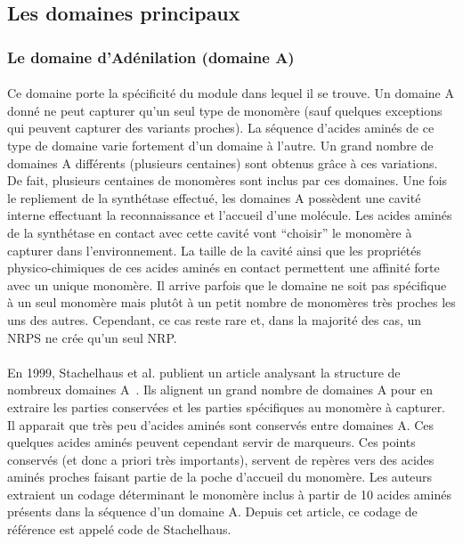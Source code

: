 \documentclass[12pt,french,twoside]{report}
\begin{document}
\subsection{Les domaines principaux}

\subsubsection{Le domaine d'Adénilation (domaine A)}

\paragraph{}Ce domaine porte la spécificité du module dans lequel il se trouve.
Un domaine A donné ne peut capturer qu'un seul type de monomère (sauf quelques exceptions qui peuvent capturer des variants proches).
La séquence d'acides aminés de ce type de domaine varie fortement d'un domaine à l'autre.
Un grand nombre de domaines A différents (plusieurs centaines) sont obtenus grâce à ces variations.
De fait, plusieurs centaines de monomères sont inclus par ces domaines.
Une fois le repliement de la synthétase effectué, les domaines A possèdent une cavité interne effectuant la reconnaissance et l'accueil d'une molécule.
Les acides aminés de la synthétase en contact avec cette cavité vont ``choisir'' le monomère à capturer dans l'environnement.
La taille de la cavité ainsi que les propriétés physico-chimiques de ces acides aminés en contact permettent une affinité forte avec un unique monomère.
Il arrive parfois que le domaine ne soit pas spécifique à un seul monomère mais plutôt à un petit nombre de monomères très proches les uns des autres.
Cependant, ce cas reste rare et, dans la majorité des cas, un NRPS ne crée qu'un seul NRP.

\paragraph{}En 1999, Stachelhaus et al. publient un article analysant la structure de nombreux domaines A~\cite{stachelhaus_specificity-conferring_1999}.
Ils alignent un grand nombre de domaines A pour en extraire les parties conservées et les parties spécifiques au monomère à capturer.
Il apparait que très peu d'acides aminés sont conservés entre domaines A.
Ces quelques acides aminés peuvent cependant servir de marqueurs.
Ces points conservés (et donc a priori très importants), servent de repères vers des acides aminés proches faisant partie de la poche d'accueil du monomère.
Les auteurs extraient un codage déterminant le monomère inclus à partir de 10 acides aminés présents dans la séquence d'un domaine A.
Depuis cet article, ce codage de référence est appelé code de Stachelhaus.
\end{document}
